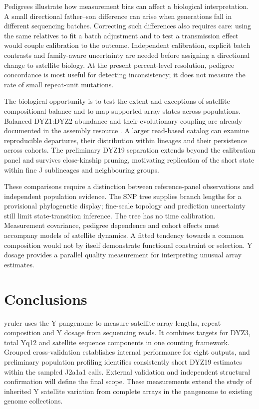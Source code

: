 \documentclass[pdflatex,sn-nature]{sn-jnl}
\newif\ifdraftnotes
\newcommand{\draftnote}[1]{\ifdraftnotes\par\smallskip{\noindent\color{draftink}\small\textbf{Author query:} #1\par}\smallskip\fi}
\begin{document}
Pedigrees illustrate how measurement bias can affect a biological interpretation. A small directional father--son difference can arise when generations fall in different sequencing batches. Correcting such differences also requires care: using the same relatives to fit a batch adjustment and to test a transmission effect would couple calibration to the outcome. Independent calibration, explicit batch contrasts and family-aware uncertainty are needed before assigning a directional change to satellite biology. At the present percent-level resolution, pedigree concordance is most useful for detecting inconsistency; it does not measure the rate of small repeat-unit mutations.

The biological opportunity is to test the extent and exceptions of satellite compositional balance and to map supported array states across populations. Balanced DYZ1:DYZ2 abundance and their evolutionary coupling are already documented in the assembly resource \cite{Hallast2026}. A larger read-based catalog can examine reproducible departures, their distribution within lineages and their persistence across cohorts. The preliminary DYZ19 separation extends beyond the calibration panel and survives close-kinship pruning, motivating replication of the short state within fine J sublineages and neighbouring groups.

These comparisons require a distinction between reference-panel observations and independent population evidence. The SNP tree supplies branch lengths for a provisional phylogenetic display; fine-scale topology and prediction uncertainty still limit state-transition inference. The tree has no time calibration. Measurement covariance, pedigree dependence and cohort effects must accompany models of satellite dynamics. A fitted tendency towards a common composition would not by itself demonstrate functional constraint or selection. Y dosage provides a parallel quality measurement for interpreting unusual array estimates.

\draftnote{Revise this discussion after expanding the population analysis, unit-equivalent composition analysis and external evaluation. Add calibrated interval coverage and a same-data comparison with published measurements where the measurement targets are comparable.}



\section{Conclusions}\label{sec:conclusions}
yruler uses the Y pangenome to measure satellite array lengths, repeat composition and Y dosage from sequencing reads. It combines targets for DYZ3, total Yq12 and satellite sequence components in one counting framework. Grouped cross-validation establishes internal performance for eight outputs, and preliminary population profiling identifies consistently short DYZ19 estimates within the sampled J2a1a1 calls. External validation and independent structural confirmation will define the final scope. These measurements extend the study of inherited Y satellite variation from complete arrays in the pangenome to existing genome collections.
\end{document}
